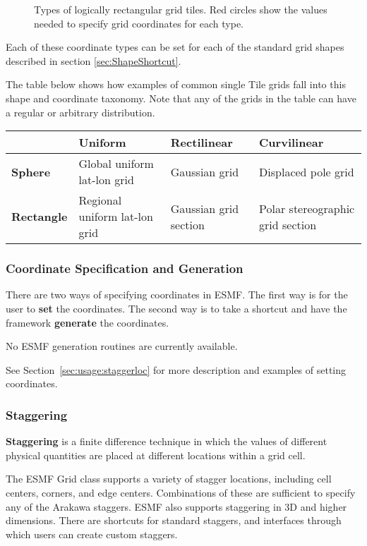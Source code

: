 \begin{figure}
\caption{Types of logically rectangular grid tiles.  Red circles show the
values needed to specify grid coordinates for each type.}
\label{fig:LogRectGrids}
\end{figure}

Each of these coordinate types can be set for each of the standard grid shapes
described in section \ref{sec:ShapeShortcut}.  

The table below shows how examples of common single Tile grids fall 
into this shape and coordinate taxonomy.  Note that any
of the grids in the table can have a regular or arbitrary distribution.

\medskip
\begin{tabular}{|p{.9in}|p{1.7in}|p{1.7in}|p{1.7in}|}
\hline
 & {\bf Uniform} & {\bf Rectilinear} & {\bf Curvilinear} \\ 
\hline
{\bf Sphere} & Global uniform lat-lon grid & Gaussian grid & Displaced pole grid \\
\hline
{\bf Rectangle} & Regional uniform lat-lon grid & Gaussian grid section & Polar stereographic grid section\\
\hline
\end{tabular}

\subsubsection{Coordinate Specification and Generation}

There are two ways of specifying coordinates in ESMF.  The
first way is for the user to {\bf set} the coordinates.  The second 
way is to take a shortcut and have the framework {\bf generate}
the coordinates.  

No ESMF generation routines are currently available.

See Section~\ref{sec:usage:staggerloc} for more description and examples of
setting coordinates.

\subsubsection{Staggering}

{\bf Staggering} is a finite difference technique in which the values 
of different physical quantities are placed at different locations
within a grid cell. 

The ESMF Grid class supports a variety of stagger locations, including
cell centers, corners, and edge centers.  Combinations of these are
sufficient to specify any of the Arakawa staggers.  ESMF also supports
staggering in 3D and higher dimensions.  There are shortcuts for 
standard staggers, and interfaces through which users can create custom
staggers.

